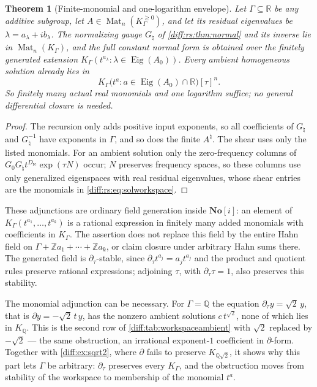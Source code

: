 \documentclass[11pt,letterpaper]{article}
\numberwithin{equation}{section}
\newtheorem{theorem}{Theorem}[section]
\theoremstyle{definition}
\theoremstyle{remark}
\newcommand{\SC}{\mathbf{No}[i]}
\newcommand{\R}{\mathbb R}
\newcommand{\Q}{\mathbb Q}
\newcommand{\Z}{\mathbb Z}
\newcommand{\der}{\partial}
\newcommand{\Mat}{\operatorname{Mat}}
\newcommand{\derT}{\der_{\tau}}
\newcommand{\Eig}{\operatorname{Eig}}
\begin{document}
\begin{theorem}[Finite-monomial and one-logarithm envelope]
\label{diff:rs:thm:workspace}
Let $\Gamma\subseteq\R$ be any additive subgroup, let $A\in\Mat_{n}(K_{\Gamma}^{\geq0})$,
and let its residual eigenvalues be $\lambda=a_{\lambda}+ib_{\lambda}$. The
normalizing gauge $G_{\natural}$ of \cref{diff:rs:thm:normal} and its inverse
lie in $\Mat_{n}(K_{\Gamma})$, and the full constant normal form is obtained over
the finitely generated extension
$K_{\Gamma}(t^{a_{\lambda}}:\lambda\in\Eig(A_{0}))$. Every ambient homogeneous
solution already lies in
\begin{equation}\label{diff:rs:eq:solworkspace}
 K_{\Gamma}\bigl(t^{a}:a\in\Eig(A_{0})\cap\R\bigr)[\tau]^{n}.
\end{equation}
So finitely many actual real monomials and one logarithm suffice; no general
differential closure is needed.
\end{theorem}
\begin{proof}
The recursion only adds positive input exponents, so all coefficients of
$G_{\natural}$ and $G_{\natural}^{-1}$ have exponents in $\Gamma$, and so does the
finite $A^{\natural}$. The shear uses only the listed monomials. For an ambient
solution only the zero-frequency columns of $G_{0}G_{\natural}t^{D_{\mathrm{re}}}\exp(\tau N)$
occur; $N$ preserves frequency spaces, so these columns use only generalized
eigenspaces with real residual eigenvalues, whose shear entries are the
monomials in \cref{diff:rs:eq:solworkspace}.
\end{proof}

These adjunctions are ordinary field generation inside $\SC$: an element
of $K_\Gamma(t^{a_1},\ldots,t^{a_k})$ is a rational expression in
finitely many added monomials with coefficients in $K_\Gamma$.
The assertion does not replace this field by the entire Hahn field on
$\Gamma+\Z a_1+\cdots+\Z a_k$, or claim closure under arbitrary Hahn
sums there. The generated field is $\derT$-stable, since
$\derT t^{a_j}=a_jt^{a_j}$ and the product and quotient rules preserve
rational expressions; adjoining $\tau$, with $\derT\tau=1$, also
preserves this stability.

The monomial adjunction can be necessary. For $\Gamma=\Q$ the equation
$\derT y=\sqrt2\,y$, that is $\der y=-\sqrt2\,t\,y$, has the nonzero ambient
solutions $c\,t^{\sqrt2}$, none of which lies in $K_{\Q}$. This is the second
row of \cref{diff:tab:workspaceambient} with $\sqrt2$ replaced by $-\sqrt2$ ---
the same obstruction, an irrational exponent-$1$ coefficient in $\der$-form.
Together with \cref{diff:ex:sqrt2}, where $\der$
fails to preserve $K_{\Q\sqrt2}$, it shows why this part lets $\Gamma$ be
arbitrary: $\derT$ preserves every $K_{\Gamma}$, and the obstruction moves from
stability of the workspace to membership of the monomial $t^{a}$.
\end{document}
